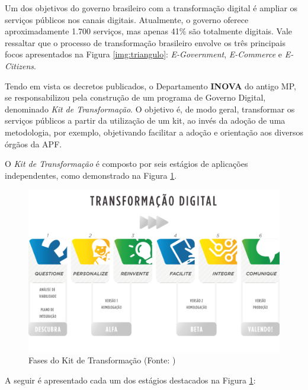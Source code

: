 Um dos objetivos do governo brasileiro com a transformação digital é ampliar os serviços públicos nos canais digitais. 
Atualmente, o governo oferece aproximadamente 1.700 serviços, mas apenas 41\% são totalmente digitais. Vale ressaltar que o processo de transformação brasileiro envolve os três principais focos apresentados na Figura \ref{img:triangulo}: \textit{E-Government}, \textit{E-Commerce} e \textit{E-Citizens}.

Tendo em vista os decretos publicados, o Departamento \textbf{INOVA} do antigo MP, se responsabilizou pela construção de um programa de Governo Digital, denominado \textit{Kit de Transformação}. O objetivo é, de modo geral, transformar os serviços públicos a partir da utilização de um kit, ao invés da adoção de uma metodologia, por exemplo, objetivando facilitar a adoção e orientação aos diversos órgãos da APF.

O \textit{Kit de Transformação} é composto por seis estágios de aplicações independentes, como demonstrado na Figura \ref{fig:EtapasTransform}.

        \begin{figure}[h]
          \centering
          \includegraphics[width=15cm]{figuras/secao-referencial/EtapasTransform.png}
          \caption{Fases do Kit de Transformação (Fonte: \cite{BRASIL2017})} 
          \label{fig:EtapasTransform}
        \end{figure}
        
        
A seguir é apresentado cada um dos estágios destacados na Figura \ref{fig:EtapasTransform}:

